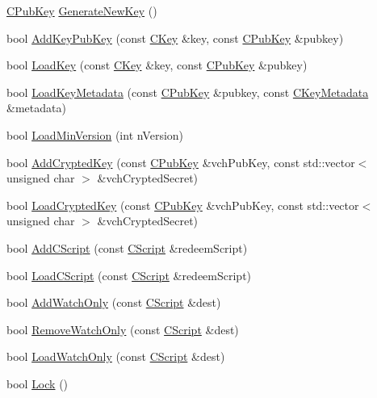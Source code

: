\begin{DoxyCompactItemize}
\item 
\hyperlink{class_c_pub_key}{C\+Pub\+Key} \hyperlink{class_c_wallet_a061fe7f54f80ec40f856b3e6365c2f4a}{Generate\+New\+Key} ()
\item 
bool \hyperlink{class_c_wallet_a3240da36cd717146296969227a3e0bd5}{Add\+Key\+Pub\+Key} (const \hyperlink{class_c_key}{C\+Key} \&key, const \hyperlink{class_c_pub_key}{C\+Pub\+Key} \&pubkey)
\item 
bool \hyperlink{class_c_wallet_a439bab81d7989f91a4f0909960516eea}{Load\+Key} (const \hyperlink{class_c_key}{C\+Key} \&key, const \hyperlink{class_c_pub_key}{C\+Pub\+Key} \&pubkey)
\item 
bool \hyperlink{class_c_wallet_a21e6580474514f838dfe1446890085a4}{Load\+Key\+Metadata} (const \hyperlink{class_c_pub_key}{C\+Pub\+Key} \&pubkey, const \hyperlink{class_c_key_metadata}{C\+Key\+Metadata} \&metadata)
\item 
bool \hyperlink{class_c_wallet_a88317da8dab80135b8db73e945e15b60}{Load\+Min\+Version} (int n\+Version)
\item 
bool \hyperlink{class_c_wallet_a3e90096a903d49cd751f05fcdb7692ce}{Add\+Crypted\+Key} (const \hyperlink{class_c_pub_key}{C\+Pub\+Key} \&vch\+Pub\+Key, const std\+::vector$<$ unsigned char $>$ \&vch\+Crypted\+Secret)
\item 
bool \hyperlink{class_c_wallet_a01fbd78238d4ef833d059f12a7e8ac9f}{Load\+Crypted\+Key} (const \hyperlink{class_c_pub_key}{C\+Pub\+Key} \&vch\+Pub\+Key, const std\+::vector$<$ unsigned char $>$ \&vch\+Crypted\+Secret)
\item 
bool \hyperlink{class_c_wallet_ad7edacad1c926bc4b7fe0dc1be95ce31}{Add\+C\+Script} (const \hyperlink{class_c_script}{C\+Script} \&redeem\+Script)
\item 
bool \hyperlink{class_c_wallet_adbf0abef9da8102f000d4afd5cec5bbc}{Load\+C\+Script} (const \hyperlink{class_c_script}{C\+Script} \&redeem\+Script)
\item 
bool \hyperlink{class_c_wallet_a022f12d5f56bbe831136388e2ac19969}{Add\+Watch\+Only} (const \hyperlink{class_c_script}{C\+Script} \&dest)
\item 
bool \hyperlink{class_c_wallet_a5be12b9afcf63079b8c009038843b5a2}{Remove\+Watch\+Only} (const \hyperlink{class_c_script}{C\+Script} \&dest)
\item 
bool \hyperlink{class_c_wallet_ad6580f1844fc639389e1c6a1e2787ee6}{Load\+Watch\+Only} (const \hyperlink{class_c_script}{C\+Script} \&dest)
\item 
bool \hyperlink{class_c_wallet_a0404b6bc1cb804aadc69b9902b52282a}{Lock} ()

\end{DoxyCompactItemize}
